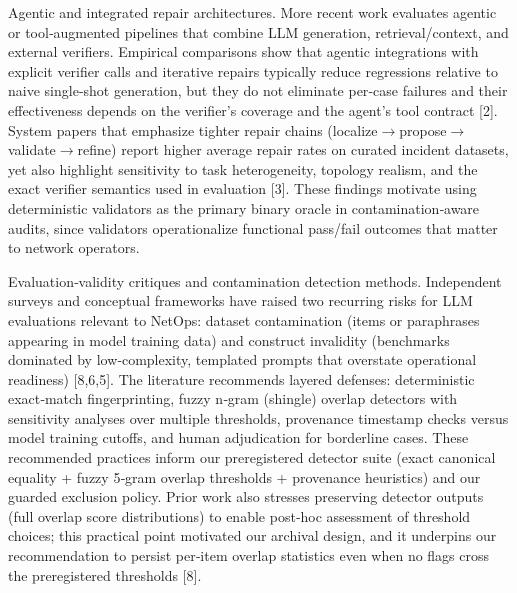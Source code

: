 \documentclass[conference]{IEEEtran}
\begin{document}
Agentic and integrated repair architectures. More recent work evaluates agentic or tool‑augmented pipelines that combine LLM generation, retrieval/context, and external verifiers. Empirical comparisons show that agentic integrations with explicit verifier calls and iterative repairs typically reduce regressions relative to naive single‑shot generation, but they do not eliminate per‑case failures and their effectiveness depends on the verifier's coverage and the agent's tool contract [2]. System papers that emphasize tighter repair chains (localize\ensuremath{\rightarrow}propose\ensuremath{\rightarrow}validate\ensuremath{\rightarrow}refine) report higher average repair rates on curated incident datasets, yet also highlight sensitivity to task heterogeneity, topology realism, and the exact verifier semantics used in evaluation [3]. These findings motivate using deterministic validators as the primary binary oracle in contamination‑aware audits, since validators operationalize functional pass/fail outcomes that matter to network operators.

Evaluation‑validity critiques and contamination detection methods. Independent surveys and conceptual frameworks have raised two recurring risks for LLM evaluations relevant to NetOps: dataset contamination (items or paraphrases appearing in model training data) and construct invalidity (benchmarks dominated by low‑complexity, templated prompts that overstate operational readiness) [8,6,5]. The literature recommends layered defenses: deterministic exact‑match fingerprinting, fuzzy n‑gram (shingle) overlap detectors with sensitivity analyses over multiple thresholds, provenance timestamp checks versus model training cutoffs, and human adjudication for borderline cases. These recommended practices inform our preregistered detector suite (exact canonical equality + fuzzy 5‑gram overlap thresholds + provenance heuristics) and our guarded exclusion policy. Prior work also stresses preserving detector outputs (full overlap score distributions) to enable post‑hoc assessment of threshold choices; this practical point motivated our archival design, and it underpins our recommendation to persist per‑item overlap statistics even when no flags cross the preregistered thresholds [8].
\end{document}
